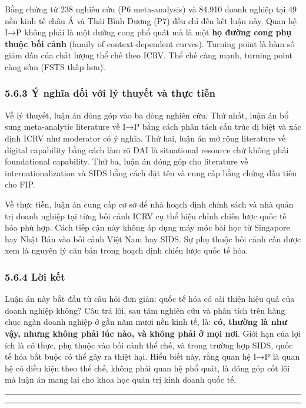 \documentclass[12pt,a4paper]{article}
\begin{document}
Bằng chứng từ 238 nghiên cứu (P6 meta-analysis) và 84.910 doanh nghiệp
tại 49 nền kinh tế châu Á và Thái Bình Dương (P7) đều chỉ đến kết luận
này. Quan hệ I→P không phải là một đường cong phổ quát mà là một
\textbf{họ đường cong phụ thuộc bối cảnh} (family of context-dependent
curves). Turning point là hàm số giảm dần của chất lượng thể chế theo
ICRV. Thể chế càng mạnh, turning point càng sớm (FSTS thấp hơn).

\hypertarget{563-uxfd-nghux129a-ux111ux1ed1i-vux1edbi-luxfd-thuyux1ebft-vuxe0-thux1ef1c-tiux1ec5n}{%
\subsubsection{5.6.3 Ý nghĩa đối với lý thuyết và thực
tiễn}\label{563-uxfd-nghux129a-ux111ux1ed1i-vux1edbi-luxfd-thuyux1ebft-vuxe0-thux1ef1c-tiux1ec5n}}

Về lý thuyết, luận án đóng góp vào ba dòng nghiên cứu. Thứ nhất, luận án
bổ sung meta-analytic literature về I→P bằng cách phân tách cấu trúc dị
biệt và xác định ICRV như moderator có ý nghĩa. Thứ hai, luận án mở rộng
literature về digital capability bằng cách làm rõ DAI là situational
resource chứ không phải foundational capability. Thứ ba, luận án đóng
góp cho literature về internationalization và SIDS bằng cách đặt tên và
cung cấp bằng chứng đầu tiên cho FIP.

Về thực tiễn, luận án cung cấp cơ sở để nhà hoạch định chính sách và nhà
quản trị doanh nghiệp tại từng bối cảnh ICRV cụ thể hiệu chỉnh chiến
lược quốc tế hóa phù hợp. Cách tiếp cận này không áp dụng máy móc bài
học từ Singapore hay Nhật Bản vào bối cảnh Việt Nam hay SIDS. Sự phụ
thuộc bối cảnh cần được xem là nguyên lý căn bản trong hoạch định chiến
lược quốc tế hóa.

\hypertarget{564-lux1eddi-kux1ebft}{%
\subsubsection{5.6.4 Lời kết}\label{564-lux1eddi-kux1ebft}}

Luận án này bắt đầu từ câu hỏi đơn giản: quốc tế hóa có cải thiện hiệu
quả của doanh nghiệp không? Câu trả lời, sau tám nghiên cứu và phân tích
trên hàng chục ngàn doanh nghiệp ở gần năm mươi nền kinh tế, là:
\textbf{có, thường là như vậy, nhưng không phải lúc nào, và không phải ở
mọi nơi}. Giới hạn của lợi ích là có thực, phụ thuộc vào bối cảnh thể
chế, và trong trường hợp SIDS, quốc tế hóa bắt buộc có thể gây ra thiệt
hại. Hiểu biết này, rằng quan hệ I→P là quan hệ có điều kiện theo thể
chế, không phải quan hệ phổ quát, là đóng góp cốt lõi mà luận án mang
lại cho khoa học quản trị kinh doanh quốc tế.

\begin{center}\rule{0.5\linewidth}{0.5pt}\end{center}

\begin{center}\rule{0.5\linewidth}{0.5pt}\end{center}
\end{document}
